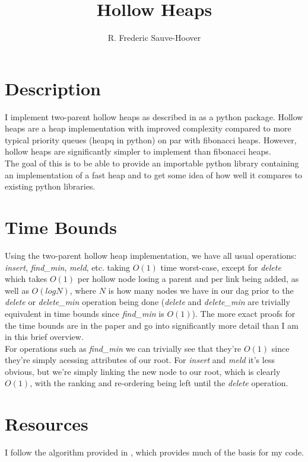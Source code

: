 \documentclass[10pt]{article}
\begin{document}
\title{Hollow Heaps}
\author{R. Frederic Sauve-Hoover}
\maketitle

\section*{Description}
I implement two-parent hollow heaps as described in \cite{hansen2015hollow} as a python package. Hollow heaps are a heap implementation with 
improved complexity compared to more typical priority queues (heapq in python) on par with fibonacci heaps. However, hollow heaps are significantly simpler to implement than fibonacci heaps.\\

The goal of this is to be able to provide an importable python library containing an implementation of a fast heap and to get some idea of how well it compares to existing python libraries.\\

\section*{Time Bounds}
Using the two-parent hollow heap implementation, we have all usual operations: \emph{insert}, \emph{find\_min}, \emph{meld}, etc. taking $O(1)$ time worst-case, except for \emph{delete} which takes $O(1)$ per hollow node losing a parent and per link being added, as well as $O(logN)$, where $N$ is how many nodes we have in our dag prior to the \emph{delete} or \emph{delete\_min} operation being done (\emph{delete} and \emph{delete\_min} are trivially equivalent in time bounds since \emph{find\_min} is $O(1)$). The more exact proofs for the time bounds are in the paper and go into significantly more detail than I am in this brief overview.\\

For operations such as \emph{find\_min} we can trivially see that they're $O(1)$ since they're simply acessing attributes of our root. For \emph{insert} and \emph{meld} it's less obvious, but 
we're simply linking the new node to our root, which is clearly $O(1)$, with the ranking and re-ordering being left until the \emph{delete} operation.

\section*{Resources}
I follow the algorithm provided in \cite{hansen2015hollow}, which provides much of the basis for my code.
\end{document}
